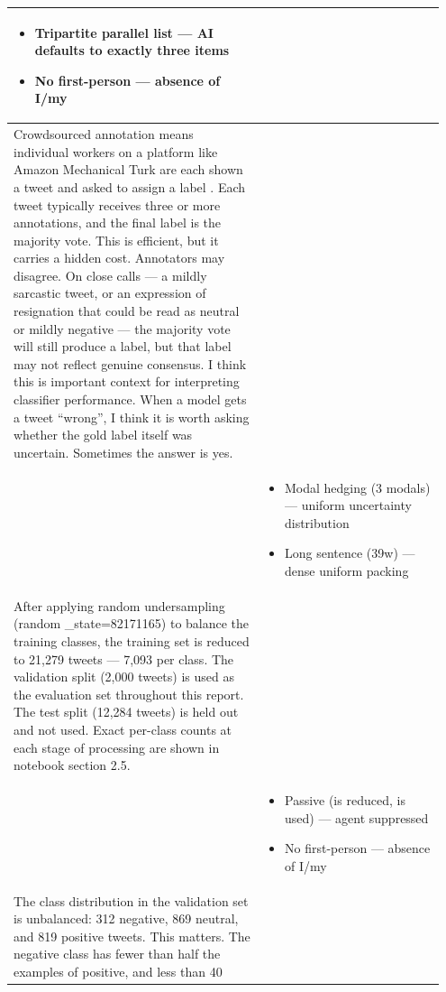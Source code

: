\documentclass[11pt]{article}
\begin{document}
\begin{longtable}{|p{0.55\linewidth}|p{0.40\linewidth}|}
\begin{itemize}[leftmargin=1em,itemsep=1pt,topsep=1pt,parsep=0pt]
  \item Tripartite parallel list --- AI defaults to exactly three items
  \item No first-person --- absence of I/my
\end{itemize} \\
\hline
Crowdsourced annotation means individual workers on a platform like Amazon Mechanical Turk are each shown a tweet and asked to assign a label . Each tweet typically receives three or more annotations, and the final label is the majority vote. This is efficient, but it carries a hidden cost. Annotators may disagree. On close calls --- a mildly sarcastic tweet, or an expression of resignation that could be read as neutral or mildly negative --- the majority vote will still produce a label, but that label may not reflect genuine consensus. I think this is important context for interpreting classifier performance. When a model gets a tweet ``wrong'', I think it is worth asking whether the gold label itself was uncertain. Sometimes the answer is yes. & \\[2pt]
\hline
\rule[-3.5cm]{0pt}{3.5cm} & \begin{itemize}[leftmargin=1em,itemsep=1pt,topsep=1pt,parsep=0pt]
  \item Modal hedging (3 modals) --- uniform uncertainty distribution
  \item Long sentence (39w) --- dense uniform packing
\end{itemize} \\
\hline
After applying random undersampling (random \_state=82171165) to balance the training classes, the training set is reduced to 21,279 tweets --- 7,093 per class. The validation split (2,000 tweets) is used as the evaluation set throughout this report. The test split (12,284 tweets) is held out and not used. Exact per-class counts at each stage of processing are shown in notebook section 2.5. & \\[2pt]
\hline
\rule[-3.5cm]{0pt}{3.5cm} & \begin{itemize}[leftmargin=1em,itemsep=1pt,topsep=1pt,parsep=0pt]
  \item Passive (is reduced, is used) --- agent suppressed
  \item No first-person --- absence of I/my
\end{itemize} \\
\hline
The class distribution in the validation set is unbalanced: 312 negative, 869 neutral, and 819 positive tweets. This matters. The negative class has fewer than half the examples of positive, and less than 40 & \\[2pt]

\end{longtable}
\end{document}
